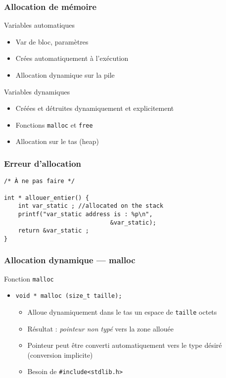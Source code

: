 \documentclass[table,handout,tikz,12pt,svgnames]{beamer}
\subtitle{\Huge Allocation Dynamique}
\date{CM3}
\begin{document}
\begin{frame}
	\titlepage
\end{frame}

\begin{frame}[fragile=singleslide]
	\frametitle{Allocation de mémoire}
		\begin{block}{Variables automatiques} %
			\begin{itemize}
			\item Var de bloc, paramètres
			\item Crées automatiquement à l'exécution
			\item Allocation dynamique sur la pile
			\end{itemize}
		\end{block}
		\begin{block}{Variables dynamiques} %
			\begin{itemize}
			\item Créées et détruites dynamiquement et explicitement
			\item Fonctions \texttt{malloc} et \texttt{free}
			\item Allocation sur le tas (heap)
			\end{itemize}
		\end{block}
\end{frame}

\begin{frame}[fragile=singleslide]
	\frametitle{Erreur d'allocation }
\begin{verbatim}
/* À ne pas faire */	

int * allouer_entier() {
	int var_static ; //allocated on the stack
	printf("var_static address is : %p\n",
							  &var_static);
	return &var_static ;
}			
\end{verbatim}
\end{frame}

\begin{frame}[fragile=singleslide]
	\frametitle{Allocation dynamique --- malloc}
		\begin{block}{Fonction \texttt{malloc}} %
			\begin{itemize}
				\item \texttt{void * malloc (size\_t taille);}
				\begin{itemize}
					\item Alloue dynamiquement dans le tas un espace de \texttt{taille} octets
					\item Résultat : \textit{pointeur non typé} vers la zone allouée
					\item Pointeur peut être converti automatiquement vers le type désiré (conversion implicite)
					\item Besoin de \texttt{\#include<stdlib.h>}
				\end{itemize}
			\end{itemize}
		\end{block}
\end{frame}
\end{document}
